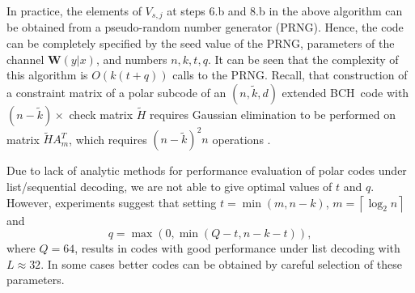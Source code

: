 \documentclass[conference]{IEEEtran}
\theoremstyle{plain}
\newcommand{\ceil}[1]{\left\lceil{#1}\right\rceil}
\begin{document}
In practice, the elements of $V_{s,j}$ at steps 6.b and 8.b in the above algorithm can be obtained from a pseudo-random number generator (PRNG). Hence, the code can be completely specified by the seed value of the PRNG,  parameters of the channel $\mathbf W(y|x)$, and numbers $n,k,t,q$.
 It can be seen that the complexity of this algorithm is $O(k(t+q))$ calls to the PRNG.
 Recall, that construction of a constraint matrix of a polar subcode of an $(n,\tilde k,d)$  extended BCH\ code with $(n-\tilde k)\times $ check matrix $\tilde H$ requires Gaussian elimination to be performed on matrix $\tilde HA_m^T$, which requires $(n-\tilde k)^2n$ operations \cite{trifonov2016polar}.  

Due to lack of analytic methods for performance evaluation of polar codes under list/sequential decoding, we are not able to give  optimal values of  $t$  and $q$. However, experiments suggest that setting $t=\min(m,n-k)$, $m=\ceil {\log_2 n}$ and 
\begin{equation}
\label{mDFSB}
q=\max(0,\min(Q-t,n-k-t)),
\end{equation}
 where $Q=64$, results in codes with good performance under list decoding with $L\approx 32$. In some cases better codes can be obtained by careful selection of these parameters.
\end{document}
